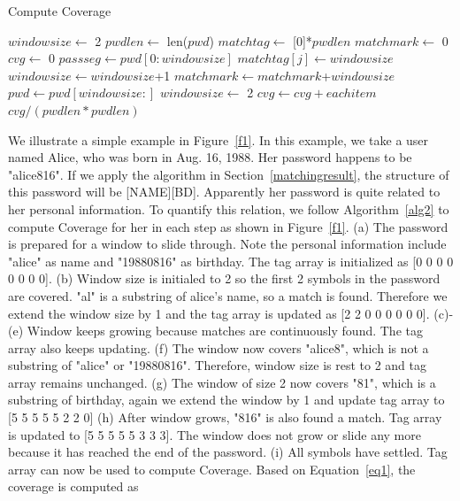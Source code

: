\documentclass{sig-alternate}
\begin{document}
\begin{algorithm}[!]
\caption{Compute Coverage}
\label{alg2}
\begin{algorithmic}[1]
\State $windowsize \gets$ 2
\State $pwdlen \gets$ len($pwd$)
\State $matchtag \gets$ [0]*$pwdlen$
\State $matchmark \gets $ 0
\State $cvg \gets $ 0
\State $passseg \gets pwd[0:windowsize]$
\State $matchtag[j] \gets windowsize$
\EndFor
{}
\State $windowsize \gets windowsize$+1
\EndIf
\Else
\State $matchmark \gets matchmark$+$windowsize$
\State $pwd \gets pwd[windowsize:]$
\State $windowsize \gets$ 2
\EndIf
\EndWhile
{}
\State $cvg \gets cvg + eachitem$
\EndFor
\State \Return $cvg/(pwdlen * pwdlen)$
\EndProcedure
\end{algorithmic}
\end{algorithm}

We illustrate a simple example in Figure~\ref{f1}. In this example, we take a user named Alice, who was born in Aug. 16, 1988. Her password happens to be "alice816". If we apply the algorithm in Section~\ref{matchingresult}, the structure of this password will be [NAME][BD]. Apparently her password is quite related to her personal information. To quantify this relation, we follow Algorithm~\ref{alg2} to compute Coverage for her in each step as shown in Figure~\ref{f1}. (a) The password is prepared for a window to slide through. Note the personal information include "alice" as name and "19880816" as birthday. The tag array is initialized as [0 0 0 0 0 0 0 0]. (b) Window size is initialed to 2 so the first 2 symbols in the password are covered. "al" is a substring of alice's name, so a match is found. Therefore we extend the window size by 1 and the tag array is updated as [2 2 0 0 0 0 0 0]. (c)-(e) Window keeps growing because matches are continuously found. The tag array also keeps updating. (f) The window now covers "alice8", which is not a substring of "alice" or "19880816". Therefore, window size is rest to 2 and tag array remains unchanged. (g) The window of size 2 now covers "81", which is a substring of birthday, again we extend the window by 1 and update tag array to [5 5 5 5 5 2 2 0] (h) After window grows, "816" is also found a match. Tag array is updated to [5 5 5 5 5 3 3 3]. The window does not grow or slide any more because it has reached the end of the password. (i) All symbols have settled. Tag array can now be used to compute Coverage. Based on Equation~\ref{eq1}, the coverage is computed as 
\end{document}
